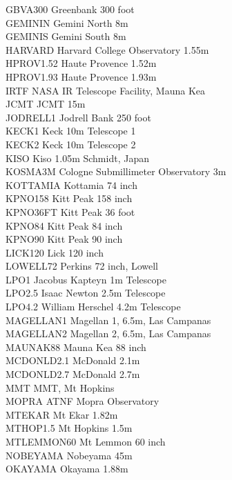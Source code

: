 \documentclass[11pt,twoside]{article}
\begin{document}
{\begin{tabbing}
GBVA300 \> Greenbank 300 foot \\
GEMININ \> Gemini North 8m \\
GEMINIS \> Gemini South 8m \\
HARVARD \> Harvard College Observatory 1.55m \\
HPROV1.52 \> Haute Provence 1.52m \\
HPROV1.93 \> Haute Provence 1.93m \\
IRTF \> NASA IR Telescope Facility, Mauna Kea \\
JCMT \> JCMT 15m \\
JODRELL1 \> Jodrell Bank 250 foot \\
KECK1 \> Keck 10m Telescope 1 \\
KECK2 \> Keck 10m Telescope 2 \\
KISO \> Kiso 1.05m Schmidt, Japan \\
KOSMA3M \> Cologne Submillimeter Observatory 3m \\
KOTTAMIA \> Kottamia 74 inch \\
KPNO158 \> Kitt Peak 158 inch \\
KPNO36FT \> Kitt Peak 36 foot \\
KPNO84 \> Kitt Peak 84 inch \\
KPNO90 \> Kitt Peak 90 inch \\
LICK120 \> Lick 120 inch \\
LOWELL72 \> Perkins 72 inch, Lowell \\
LPO1 \> Jacobus Kapteyn 1m Telescope \\
LPO2.5 \> Isaac Newton 2.5m Telescope \\
LPO4.2 \> William Herschel 4.2m Telescope \\
MAGELLAN1 \> Magellan 1, 6.5m, Las Campanas \\
MAGELLAN2 \> Magellan 2, 6.5m, Las Campanas \\
MAUNAK88 \> Mauna Kea 88 inch \\
MCDONLD2.1 \> McDonald 2.1m \\
MCDONLD2.7 \> McDonald 2.7m \\
MMT \> MMT, Mt Hopkins \\
MOPRA \> ATNF Mopra Observatory \\
MTEKAR \> Mt Ekar 1.82m \\
MTHOP1.5 \> Mt Hopkins 1.5m \\
MTLEMMON60 \> Mt Lemmon 60 inch \\
NOBEYAMA \> Nobeyama 45m \\
OKAYAMA \> Okayama 1.88m \\

\end{tabbing}}
\end{document}
